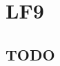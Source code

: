 \chapter{\Huge{LF9}}\label{ch:lf9}
\section{TODO}\label{sec:lf9_first_Section}
\setcounter{section}{0}